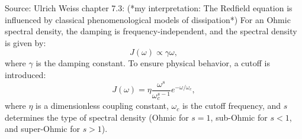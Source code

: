 Source: Ulrich Weiss chapter 7.3:
(*my interpretation: The Redfield equation is influenced by classical phenomenological models of dissipation*)
For an Ohmic spectral density, the damping is frequency-independent, and the spectral density is given by:
\begin{equation} \label{eq:ohmic_spectral_density}
	J(\omega) \propto \gamma \omega,
\end{equation}
where \( \gamma \) is the damping constant. To ensure physical behavior, a cutoff is introduced:
\begin{equation} \label{eq:cutoff_spectral_density}
	J(\omega) = \eta \frac{\omega^s}{\omega_c^{s-1}} e^{-\omega / \omega_c},
\end{equation}
where \( \eta \) is a dimensionless coupling constant, \( \omega_c \) is the cutoff frequency, and \( s \) determines the type of spectral density (Ohmic for \( s = 1 \), sub-Ohmic for \( s < 1 \), and super-Ohmic for \( s > 1 \)).
